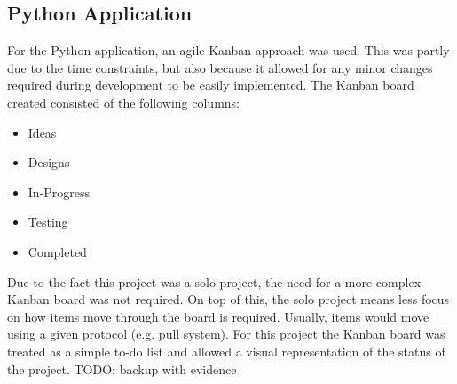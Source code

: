 \subsection{Python Application}
For the Python application, an agile Kanban approach was used. This was partly due to the time constraints, but also because it allowed for
any minor changes required during development to be easily implemented. The Kanban board created consisted of the following columns:
\begin{itemize}
    \item Ideas
    \item Designs
    \item In-Progress
    \item Testing
    \item Completed
\end{itemize}
Due to the fact this project was a solo project, the need for a more complex Kanban board was not required. On top of this, the solo project
means less focus on how items move through the board is required. Usually, items would move using a given protocol (e.g. pull system). For this
project the Kanban board was treated as a simple to-do list and allowed a visual representation of the status of the project.
TODO: backup with evidence